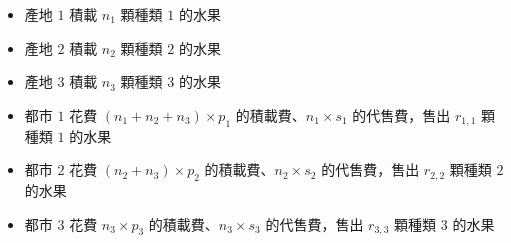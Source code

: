 \begin{itemize}
\tightlist
\item
  產地 \begin{math}1\end{math} 積載 \begin{math}n_1\end{math} 顆種類
  \begin{math}1\end{math} 的水果
\item
  產地 \begin{math}2\end{math} 積載 \begin{math}n_2\end{math} 顆種類
  \begin{math}2\end{math} 的水果
\item
  產地 \begin{math}3\end{math} 積載 \begin{math}n_3\end{math} 顆種類
  \begin{math}3\end{math} 的水果
\item
  都市 \begin{math}1\end{math} 花費
  \begin{math}(n_1 + n_2 + n_3) \times p_1\end{math}
  的積載費、\begin{math}n_1 \times s_1\end{math} 的代售費，售出
  \begin{math}r_{1, 1}\end{math} 顆種類 \begin{math}1\end{math} 的水果
\item
  都市 \begin{math}2\end{math} 花費
  \begin{math}(n_2 + n_3) \times p_2\end{math}
  的積載費、\begin{math}n_2 \times s_2\end{math} 的代售費，售出
  \begin{math}r_{2, 2}\end{math} 顆種類 \begin{math}2\end{math} 的水果
\item
  都市 \begin{math}3\end{math} 花費 \begin{math}n_3 \times p_3\end{math}
  的積載費、\begin{math}n_3 \times s_3\end{math} 的代售費，售出
  \begin{math}r_{3, 3}\end{math} 顆種類 \begin{math}3\end{math} 的水果
\end{itemize}

